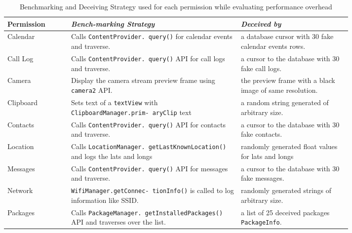 \begin{table}[htbp]
    \caption{Benchmarking and Deceiving Strategy used for each permission while evaluating performance overhead }
    {\tiny
    \begin{center}
            \begin{tabular}{|>{\centering}m{0.15\linewidth}|m{0.4\linewidth}|m{0.26\linewidth}|}
                \hline
                \textbf{Permission} & \textbf{\textit{Bench-marking Strategy}} & \textbf{\textit{Deceived by}} \\
                \hline
                Calendar & Calls \texttt{ContentProvider. query()} for calendar events and traverse. & a database cursor with 30 fake calendar events rows.\\
                \hline
                Call Log & Calls \texttt{ContentProvider. query()} API for call logs and traverse. & a cursor to the database with 30 fake call logs. \\
                \hline
                Camera & Display the camera stream preview frame using \texttt{camera2} API. & the preview frame with a black image of same resolution. \\
                \hline
                Clipboard & Sets text of a \texttt{textView} with \texttt{ClipboardManager.prim- aryClip} text & a random string generated of arbitrary size.  \\
                \hline
                Contacts & Calls \texttt{ContentProvider. query()} API for contacts and traverse. & a cursor to the database with 30 fake contacts. \\
                \hline
                Location & Calls \texttt{LocationManager. getLastKnownLocation()} and logs the lats and longs & randomly generated float values  for lats and longs\\
                \hline
                Messages & Calls \texttt{ContentProvider. query()} API for messages and traverse. & a cursor to the database with 30 fake messages. \\
                \hline
                Network & \texttt{WifiManager.getConnec- tionInfo()} is called to log information like SSID. & randomly generated strings of arbitrary size. \\
                \hline
                Packages &  Calls \texttt{PackageManager. getInstalledPackages()} API and traverses over the list. & a list of 25 deceived packages \texttt{PackageInfo}. \\

\end{tabular}
\end{center}}
\end{table}
